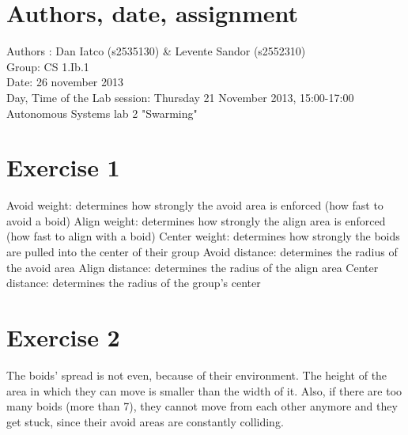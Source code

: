 \documentclass[a4paper,10pt]{article}
\begin{document}
\section*{Authors, date, assignment}
Authors : Dan Iatco (s2535130) \& Levente Sandor (s2552310)\\
Group: CS 1.Ib.1\\
Date:  26 november 2013\\
Day, Time of the Lab session: Thursday 21 November 2013, 15:00-17:00\\
Autonomous Systems lab 2 "Swarming"\\

\section*{Exercise 1}
Avoid weight: determines how strongly the avoid area is enforced (how fast to avoid a boid)
Align weight: determines how strongly the align area is enforced (how fast to align with a boid)
Center weight: determines how strongly the boids are pulled into the center of their group
Avoid distance: determines the radius of the avoid area
Align distance: determines the radius of the align area
Center distance: determines the radius of the group's center

\section*{Exercise 2}
The boids' spread is not even, because of their environment. The height of the area in which they can
move is smaller than the width of it. Also, if there are too many boids (more than 7), they cannot move
from each other anymore and they get stuck, since their avoid areas are constantly colliding.
\end{document}
